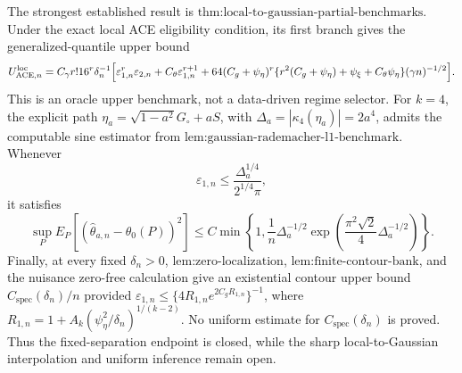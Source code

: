 The strongest established result is \(\text{thm:local-to-gaussian-partial-benchmarks}\). Under the exact local ACE eligibility condition, its first branch gives the generalized-quantile upper bound \[ U_{\mathrm{ACE},n}^{\mathrm{loc}} = C_{\gamma}r!16^r\delta_n^{-1}\Bigl[\varepsilon_{1,n}^r\varepsilon_{2,n}+C_{\theta}\varepsilon_{1,n}^{r+1}+64(C_g+\psi_{\eta})^r\{r^2(C_g+\psi_{\eta})+\psi_{\xi}+C_{\theta}\psi_{\eta}\}(\gamma n)^{-1/2}\Bigr]. \] This is an oracle upper benchmark, not a data-driven regime selector. For \(k=4\), the explicit path \(\eta_a=\sqrt{1-a^2}G_{\circ}+aS\), with \(\Delta_a=|\kappa_4(\eta_a)|=2a^4\), admits the computable sine estimator from \(\text{lem:gaussian-rademacher-l1-benchmark}\). Whenever \[ \varepsilon_{1,n}\le\frac{\Delta_a^{1/4}}{2^{1/4}\pi}, \] it satisfies \[ \sup_P E_P[(\widehat\theta_{a,n}-\theta_0(P))^2] \le C\min\left\{1,\frac1n\Delta_a^{-1/2}\exp\left(\frac{\pi^2\sqrt2}{4}\Delta_a^{-1/2}\right)\right\}. \] Finally, at every fixed \(\delta_n>0\), \(\text{lem:zero-localization}\), \(\text{lem:finite-contour-bank}\), and the nuisance zero-free calculation give an existential contour upper bound \(C_{\mathrm{spec}}(\delta_n)/n\) provided \(\varepsilon_{1,n}\le\{4R_{1,n}e^{2C_gR_{1,n}}\}^{-1}\), where \(R_{1,n}=1+A_k(\psi_{\eta}^2/\delta_n)^{1/(k-2)}\). No uniform estimate for \(C_{\mathrm{spec}}(\delta_n)\) is proved. Thus the fixed-separation endpoint is closed, while the sharp local-to-Gaussian interpolation and uniform inference remain open.